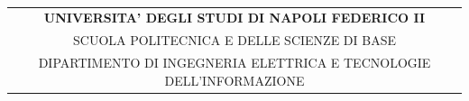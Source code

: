 \documentclass[a4page]{article}
\begin{document}
\clearpage
\newcommand\nbvspace[1][3]{\vspace*{\stretch{#1}}}
\newcommand\nbstretchyspace{\spaceskip0.5em plus 0.25em minus 0.25em}
\begin{titlepage}
\begin{center}
\tt
\nbvspace[0.03]
\begin{tabular}[c]{@{}c@{}}\vspace{0.1cm}\textbf{\LARGE{UNIVERSITA' DEGLI STUDI DI NAPOLI FEDERICO II}}\\\vspace{0.1cm}\Large{SCUOLA POLITECNICA E DELLE SCIENZE DI BASE}\\\large{DIPARTIMENTO DI INGEGNERIA ELETTRICA E TECNOLOGIE DELL'INFORMAZIONE}\end{tabular}


\end{center}
\end{titlepage}
\end{document}
